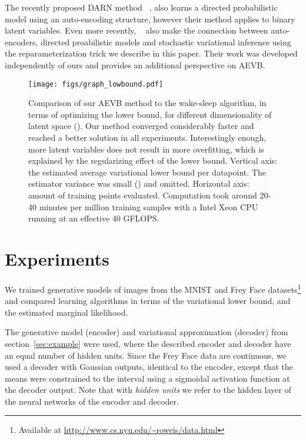 \documentclass{article} \usepackage{nips13submit_e,times}
\theoremstyle{definition}
\theoremstyle{definition}
\begin{document}
The recently proposed DARN method ~\cite{gregor2013deep}, also learns a directed probabilistic model using an auto-encoding structure, however their method applies to binary latent variables. 
Even more recently, ~\cite{rezende2014stochastic} also make the connection between auto-encoders, directed proabilistic models and stochastic variational inference using the reparameterization trick we describe in this paper. Their work was developed independently of ours and provides an additional perspective on AEVB.







\begin{figure}[t]
\texttt{[image: figs/graph\_lowbound.pdf]}
\caption{Comparison of our AEVB method to the wake-sleep algorithm, in terms of optimizing the lower bound, for different dimensionality of latent space (). Our method converged considerably faster and reached a better solution in all experiments. Interestingly enough, more latent variables does not result in more overfitting, which is explained by the regularizing effect of the lower bound. Vertical axis: the estimated average variational lower bound per datapoint. The estimator variance was small () and omitted. Horizontal axis: amount of training points evaluated. Computation took around 20-40 minutes per million training samples with a Intel Xeon CPU running at an effective 40 GFLOPS.}\label{fig:lowbound}
\end{figure}

\section{Experiments}



We trained generative models of images from the MNIST and Frey Face datasets\footnote{Available at \url{http://www.cs.nyu.edu/~roweis/data.html}} and compared learning algorithms in terms of the variational lower bound, and the estimated marginal likelihood. 

The generative model (encoder) and variational approximation (decoder) from section~\ref{sec:example} were used, where the described encoder and decoder have an equal number of hidden units. Since the Frey Face data are continuous, we used a decoder with Gaussian outputs, identical to the encoder, except that the means were constrained to the interval  using a sigmoidal activation function at the decoder output. 
Note that with \emph{hidden units} we refer to the hidden layer of the neural networks of the encoder and decoder.
\end{document}
